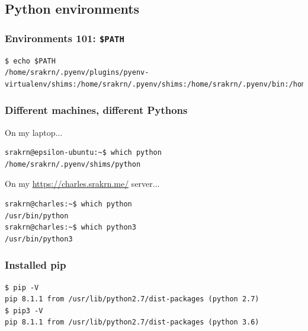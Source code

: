 \documentclass[aspectratio=169]{beamer}
\begin{document}
\subsection{Python environments}

\begin{frame}[fragile]
    \frametitle{Environments 101: \texttt{\$PATH}}
    \begin{lstlisting}[style=terminal]
$ echo $PATH
/home/srakrn/.pyenv/plugins/pyenv-virtualenv/shims:/home/srakrn/.pyenv/shims:/home/srakrn/.pyenv/bin:/home/srakrn/.local/bin:/usr/local/bin:/usr/local/sbin:/home/srakrn/.local/bin:/usr/sbin:/usr/bin:/sbin:/bin:/usr/games:/usr/local/games:/snap/bin\end{lstlisting}
\end{frame}

\begin{frame}[fragile]
    \frametitle{Different machines, different Pythons}
    On my laptop...
    \begin{lstlisting}[style=terminal]
srakrn@epsilon-ubuntu:~$ which python
/home/srakrn/.pyenv/shims/python\end{lstlisting}
    On my \href{charles}{https://charles.srakrn.me/} server...
    \begin{lstlisting}[style=terminal]
srakrn@charles:~$ which python
/usr/bin/python
srakrn@charles:~$ which python3
/usr/bin/python3\end{lstlisting}
\end{frame}

\begin{frame}[fragile]
    \frametitle{Installed pip}
    \begin{lstlisting}[style=terminal]
$ pip -V 
pip 8.1.1 from /usr/lib/python2.7/dist-packages (python 2.7)
$ pip3 -V 
pip 8.1.1 from /usr/lib/python2.7/dist-packages (python 3.6)\end{lstlisting}
\end{frame}
\end{document}

